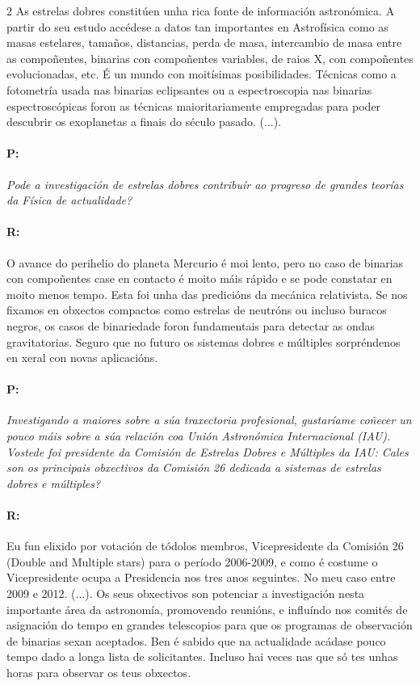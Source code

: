\begin{multicols}{2}
As estrelas dobres constitúen unha rica fonte de información
astronómica. A partir do seu estudo accédese a datos tan importantes en
Astrofísica como as masas estelares, tamaños, distancias, perda de masa,
intercambio de masa entre as compoñentes, binarias con compoñentes variables,
de raios X, con compoñentes evolucionadas, etc. É un mundo con moitísimas
posibilidades. Técnicas como a fotometría usada nas binarias eclipsantes ou a
espectroscopia nas binarias espectroscópicas foron as técnicas maioritariamente
empregadas para poder descubrir os exoplanetas a finais do século pasado.
(...).

\paragraph{P:}

\textit{ Pode a investigación de estrelas dobres contribuír ao progreso de
grandes teorías da Física de actualidade? }

\paragraph{R:}

O avance do perihelio do planeta Mercurio é moi lento, pero no
caso de binarias con compoñentes case en contacto é moito máis rápido e se pode
constatar en moito menos tempo. Esta foi unha das predicións da mecánica
relativista. Se nos fixamos en obxectos compactos como estrelas de neutróns ou
incluso buracos negros, os casos de binariedade foron fundamentais para
detectar as ondas gravitatorias. Seguro que no futuro os sistemas dobres e
múltiples sorpréndenos en xeral con novas aplicacións.

\paragraph{P:}

\textit{ Investigando a maiores sobre a súa traxectoria profesional, gustaríame
coñecer un pouco máis sobre a súa relación coa Unión Astronómica Internacional
(IAU). Vostede foi presidente da Comisión de Estrelas Dobres e Múltiples da
IAU: Cales son os principais obxectivos da Comisión 26 dedicada a sistemas de
estrelas dobres e múltiples? }

\paragraph{R:}

Eu fun elixido por votación de tódolos membros, Vicepresidente da Comisión 26
(Double and Multiple stars) para o período 2006-2009, e como é costume o
Vicepresidente ocupa a Presidencia nos tres anos seguintes. No meu caso entre
2009 e 2012. (...). Os seus obxectivos son potenciar a investigación nesta
importante área da astronomía, promovendo reunións, e influíndo nos comités de
asignación do tempo en grandes telescopios para que os programas de observación
de binarias sexan aceptados. Ben é sabido que na actualidade acádase pouco
tempo dado a longa lista de solicitantes. Incluso hai veces nas que só tes
unhas horas para observar os teus obxectos.




\end{multicols}
